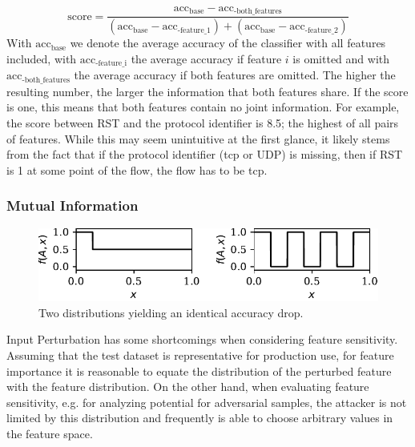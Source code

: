 \documentclass[conference]{IEEEtran}
\begin{document}
\begin{equation}
\text{score} = \frac{\text{acc}_\text{base}-\text{acc}_\text{-both\_features}}{\left(\text{acc}_\text{base}-\text{acc}_\text{-feature\_1}\right) + \left(\text{acc}_\text{base}-\text{acc}_\text{-feature\_2}\right)}
\end{equation}
With $\text{acc}_\text{base}$ we denote the average accuracy of the classifier with all features included, with $\text{acc}_\text{-feature\_i}$ the average accuracy if feature $i$ is omitted and with $\text{acc}_\text{-both\_features}$ the average accuracy if both features are omitted. The higher the resulting number, the larger the information that both features share. If the score is one, this means that both features contain no joint information. For example, the score between RST and the protocol identifier is 8.5; the highest of all pairs of features. While this may seem unintuitive at the first glance, it likely stems from the fact that if the protocol identifier (\gls{tcp} or UDP) is missing, then if RST is 1 at some point of the flow, the flow has to be \gls{tcp}.

\subsubsection{Mutual Information}
\begin{figure}
\includegraphics[width=\columnwidth]{../plots/mutinfo_example.pdf}
\caption{Two distributions yielding an identical accuracy drop.}
\label{fig:mutinfo_example}
\end{figure}
Input Perturbation has some shortcomings when considering feature sensitivity. Assuming that the test dataset is representative for production use, for feature importance it is reasonable to equate the distribution of the perturbed feature with the feature distribution. On the other hand, when evaluating feature sensitivity, e.g. for analyzing potential for adversarial samples, the attacker is not limited by this distribution and frequently is able to choose arbitrary values in the feature space.
\end{document}
